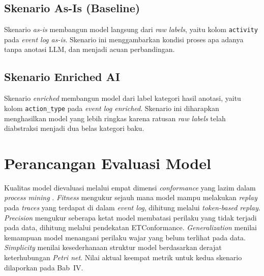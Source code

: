 \subsection{Skenario As-Is (Baseline)}

Skenario \textit{as-is} membangun model langsung dari \textit{raw labels}, yaitu kolom \texttt{activity} pada \textit{event log as-is}. Skenario ini menggambarkan kondisi proses apa adanya tanpa anotasi LLM, dan menjadi acuan perbandingan.

\subsection{Skenario Enriched AI}

Skenario \textit{enriched} membangun model dari label kategori hasil anotasi, yaitu kolom \texttt{action\_type} pada \textit{event log enriched}. Skenario ini diharapkan menghasilkan model yang lebih ringkas karena ratusan \textit{raw labels} telah diabstraksi menjadi dua belas kategori baku.

\section{Perancangan Evaluasi Model}

Kualitas model dievaluasi melalui empat dimensi \textit{conformance} yang lazim dalam \textit{process mining} \cite{buijs2014quality, vanderAalst2016_process_mining}. \textit{Fitness} mengukur sejauh mana model mampu melakukan \textit{replay} pada \textit{traces} yang terdapat di dalam \textit{event log}, dihitung melalui \textit{token-based replay}. \textit{Precision} mengukur seberapa ketat model membatasi perilaku yang tidak terjadi pada data, dihitung melalui pendekatan ETConformance. \textit{Generalization} menilai kemampuan model menangani perilaku wajar yang belum terlihat pada data. \textit{Simplicity} menilai kesederhanaan struktur model berdasarkan derajat keterhubungan \textit{Petri net}. Nilai aktual keempat metrik untuk kedua skenario dilaporkan pada Bab~IV.

